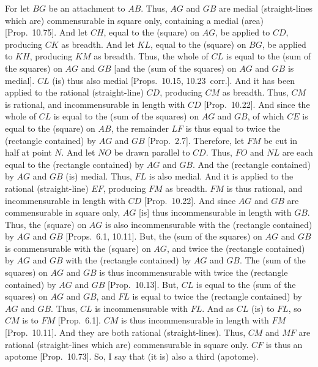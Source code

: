 \begin{Parallel}{}{}
{For let $BG$ be an attachment to $AB$. Thus, $AG$ and $GB$ are medial
(straight-lines which are) commensurable in square only, containing
a medial (area) [Prop.~10.75]. And let $CH$,
equal to the (square) on $AG$, be applied to $CD$, producing
$CK$ as breadth. And let $KL$, equal to the (square) on $BG$, 
be applied to $KH$, producing $KM$ as breadth. Thus, the whole
of $CL$ is equal to the (sum of the squares) on $AG$ and $GB$ [and
the (sum of the squares) on $AG$ and $GB$ is medial]. $CL$ (is) thus
also medial [Props.~10.15, 10.23~corr.]. And it has been applied to the rational (straight-line)
$CD$, producing $CM$ as breadth. Thus, $CM$ is rational, and
incommensurable in length with $CD$ [Prop.~10.22]. And since the whole of $CL$ is equal
to the (sum of the squares) on $AG$ and $GB$, of which $CE$ is
equal to the (square) on $AB$, the remainder $LF$ is thus equal to
twice the (rectangle contained) by $AG$ and $GB$ [Prop.~2.7]. Therefore, let $FM$ be
cut in half at point $N$. And let $NO$ be drawn parallel to $CD$.
Thus, $FO$ and $NL$ are each equal to the (rectangle contained) by
$AG$ and $GB$. And the (rectangle contained) by $AG$ and $GB$ (is)
medial. Thus, $FL$ is also medial. And it is applied to the
rational (straight-line) $EF$, producing $FM$ as breadth.
$FM$ is thus rational, and incommensurable in length with $CD$ [Prop.~10.22]. And since $AG$ and $GB$
are commensurable in square only, $AG$ [is] thus incommensurable
in length with $GB$. Thus, the (square) on $AG$ is also incommensurable
with the (rectangle contained) by $AG$ and $GB$
[Props.~6.1, 10.11]. But,  the (sum of the squares) on $AG$
and $GB$ is commensurable with the (square) on $AG$, and twice the
(rectangle contained) by $AG$ and $GB$ with the (rectangle contained)
by $AG$ and $GB$. The (sum of the squares) on $AG$ and $GB$
is thus incommensurable with twice the (rectangle contained)
by $AG$ and $GB$ [Prop.~10.13]. But,
$CL$ is equal to the (sum of the squares) on $AG$ and $GB$, 
and $FL$ is equal to twice the (rectangle contained) by $AG$ and $GB$. Thus,
$CL$ is incommensurable with $FL$. And as $CL$ (is) to $FL$, so
$CM$ is to $FM$ [Prop.~6.1].  $CM$ is thus
incommensurable in length with $FM$ [Prop.~10.11]. And they are both rational (straight-lines). Thus, $CM$ and $MF$ are rational (straight-lines which are)
commensurable in square only. $CF$ is thus an apotome [Prop.~10.73]. So, I say that (it is) also a
third (apotome).

}
\end{Parallel}
